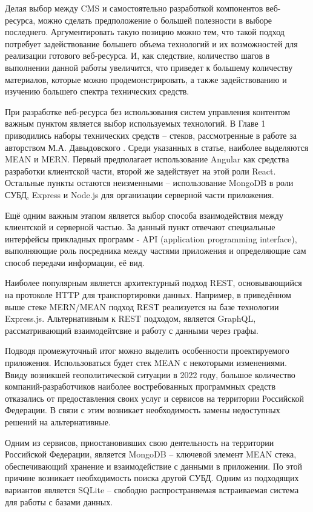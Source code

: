 Делая выбор между CMS и самостоятельно разработкой компонентов веб-ресурса, можно сделать предположение о большей полезности в выборе последнего.
Аргументировать такую позицию можно тем, что такой подход потребует задействование большего объема технологий и их возможностей для реализации готового веб-ресурса.
И, как следствие, количество шагов в выполнении данной работы увеличится, что приведет к большему количеству материалов, которые можно продемонстрировать, а также задействованию и изучению большего спектра технических средств.

При разработке веб-ресурса без использования систем управления контентом важным пунктом является выбор используемых технологий.
В Главе 1 приводились наборы технических средств -- стеков, рассмотренные в работе за авторством М.А. Давыдовского \cite{davidovsky-vibor}.
Среди указанных в статье, наиболее выделяются MEAN и MERN.
Первый предполагает использование Angular как средства разработки клиентской части, второй же задействует на этой роли React.
Остальные пункты остаются неизменными -- использование MongoDB в роли СУБД, Express и Node.js для организации серверной части приложения.

Ещё одним важным этапом является выбор способа взаимодействия между клиентской и серверной частью.
За данный пункт отвечают специальные интерфейсы прикладных программ - API (application programming interface), выполняющие роль посредника между частями приложения и определяющие сам способ передачи информации, её вид.

Наиболее популярным является архитектурный подход REST, основывающийся на протоколе HTTP для транспортировки данных.
Например, в приведённом выше стеке MERN/MEAN подход REST реализуется на базе технологии Express.js.
Альтернативным к REST подходом, является GraphQL, рассматривающий взаимодейтсвие и работу с данными через графы.

Подводя промежуточный итог можно выделить особенности проектируемого приложения.
Использоваться будет стек MEAN с некоторыми изменениями.
Ввиду возникшей геополитической ситуации в 2022 году, большое количество компаний-разработчиков наиболее востребованных программных средств отказались от предоставления своих услуг и сервисов на территории Российской Федерации.
В связи с этим возникает необходимость замены недоступных решений на альтернативные.

Одним из сервисов, приостановивших свою деятельность на территории Российской Федерации, является MongoDB -- ключевой элемент MEAN стека, обеспечивающий хранение и взаимодействие с данными в приложении.
По этой причине возникает необходимость поиска другой СУБД.
Одним из подходящих вариантов является SQLite -- свободно распространяемая встраиваемая система для работы с базами данных.

